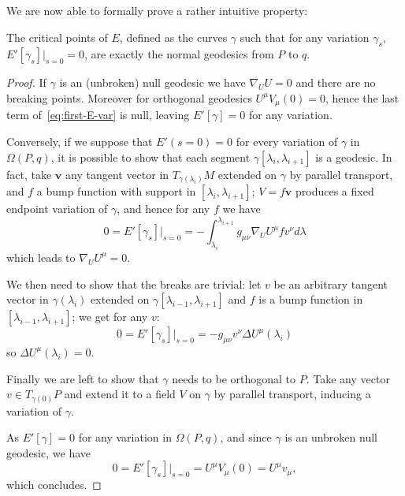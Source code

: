 We are now able to formally prove a rather intuitive property:
\begin{prop}
	\label{prop:perp-critical-gamma}
	The critical points of \(E\), defined as the curves \(\gamma\) such that for any variation \(\gamma_s\), \(E'[\gamma_s]\Big\vert_{s = 0} = 0\), are exactly the normal geodesics from \(P\) to \(q\).
\end{prop}
\begin{proof}
	If \(\gamma\) is an (unbroken) null geodesic we have \(\nabla_UU = 0\) and there are no breaking points. Moreover for orthogonal geodesics
	\(U^{\mu}V_{\mu}(0) = 0\), hence the last term of~\eqref{eq:first-E-var} is null, leaving \(E'[\gamma] = 0\) for any variation.
	
	Conversely, if we suppose that \(E'(s =0) = 0\) for every variation of \(\gamma\) in \(\Omega (P,q)\), it is possible to show that each segment \(\gamma[\lambda_i, \lambda_{i + 1}]\) is a geodesic.
	In fact, take \(\textbf{v}\) any tangent vector in \(T_{\gamma(\lambda_i)}M\)  extended on \(\gamma\) by parallel transport, and \(f\) a bump function with support in \([\lambda_i, \lambda_{i + 1}]\); \(V = f\textbf{v}\) produces a fixed endpoint variation of \(\gamma\), and hence for any \(f\) we have 
	\[
	0 = E'[\gamma_s]\vert_{s = 0} = -\int_{\lambda_i}^{\lambda_{i+1}} g_{\mu\nu}\nabla_UU^{\mu} f v^{\nu} d\lambda
	\]
	which leads to \(\nabla_UU^{\mu} = 0\).
	
	We then need to show that the breaks are trivial: let \(v\) be an arbitrary tangent vector in \(\gamma(\lambda_i)\) extended on \(\gamma[\lambda_{i - 1}, \lambda_{i + 1}]\) and \(f\) is a bump function in \([\lambda_{i - 1}, \lambda_{i + 1}]\); we get for any \(v\):
	\[
	0 = E'[\gamma_s]\vert_{s = 0} = -g_{\mu\nu}v^{\nu}\Delta U^{\mu}(\lambda_i)
	\]
	so \(\Delta U^{\mu}(\lambda_i) = 0\).
	
	Finally we are left to show that \(\gamma\) needs to be orthogonal to \(P\). Take any vector \(v \in T_{\gamma(0)}P\) and extend it to a field \(V\) on \(\gamma\) by parallel transport, inducing a variation of \(\gamma\).
	
	\noindent As \(E'[\gamma] = 0\) for any variation in \(\Omega(P, q)\), and since \(\gamma\) is an unbroken null geodesic, we have
	\[
	0 = E'[\gamma_s] \Big\vert_{s = 0} = U^{\mu}V_{\mu} (0) = U^{\mu}v_{\mu},
	\]
	which concludes.
\end{proof}

